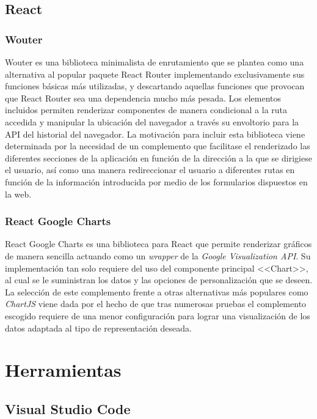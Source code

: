 \subsection{React}

\subsubsection{Wouter}

Wouter \cite{dependencies:wouter} es una biblioteca minimalista de enrutamiento que se plantea como una alternativa al popular paquete React Router implementando exclusivamente sus funciones básicas más utilizadas, y descartando aquellas funciones que provocan que React Router sea una dependencia mucho más pesada. Los elementos incluidos permiten renderizar componentes de manera condicional a la ruta accedida y manipular la ubicación del navegador a través su envoltorio para la API del historial del navegador.
La motivación para incluir esta biblioteca viene determinada por la necesidad de un complemento que facilitase el renderizado las diferentes secciones de la aplicación en función de la dirección a la que se dirigiese el usuario, así como una manera redireccionar el usuario a diferentes rutas en función de la información introducida por medio de los formularios dispuestos en la web.

\subsubsection{React Google Charts}

React Google Charts \cite{dependencies:react_google_charts} es una biblioteca para React que permite renderizar gráficos de manera sencilla actuando como un \emph{wrapper} de la \emph{Google Visualization API}. Su implementación tan solo requiere del uso del componente principal <<Chart>>, al cual se le suministran los datos y las opciones de personalización que se deseen. La selección de este complemento frente a otras alternativas más populares como \emph{ChartJS} viene dada por el hecho de que tras numerosas pruebas el complemento escogido requiere de una menor configuración para lograr una visualización de los datos adaptada al tipo de representación deseada.

\section{Herramientas} \label{sec:herramientas}

\subsection{Visual Studio Code}

